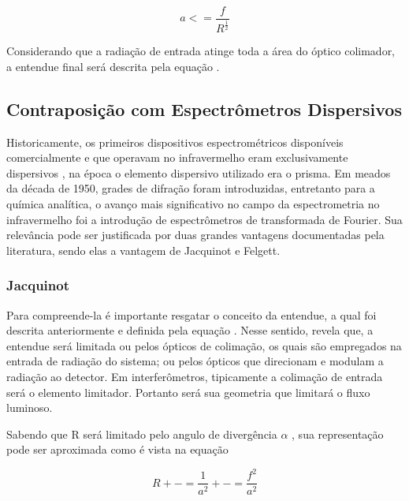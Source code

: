 \documentclass[oneside,openright,12pt]{ufsm_2021} %
\begin{document}
    \begin{equation}
        a <= \frac{f}{R^{\frac{1}{2}}}
    \end{equation}
    
    \par Considerando que a radiação de entrada atinge toda a área do óptico colimador, a entendue final será descrita pela equação \cite{Eq8}.

    \subsection{Contraposição com Espectrômetros Dispersivos}

    \par Historicamente, os primeiros dispositivos espectrométricos disponíveis comercialmente e que operavam no infravermelho eram exclusivamente dispersivos \cite{LivroFundamentos}, na época o elemento dispersivo utilizado era o prisma. Em meados da década de 1950, grades de difração foram introduzidas, entretanto para a química analítica, o avanço mais significativo no campo da espectrometria no infravermelho foi a introdução de espectrômetros de transformada de Fourier. Sua relevância pode ser justificada por duas grandes vantagens documentadas pela literatura, sendo elas a vantagem de Jacquinot e Felgett.

    \subsubsection{Jacquinot}
    \par Para compreende-la é importante resgatar o conceito da entendue, a qual foi descrita anteriormente e definida pela equação \cite{Eq1}. Nesse sentido, \cite{LivroFT} revela que, a entendue será limitada ou pelos ópticos de colimação, os quais são empregados na entrada de radiação do sistema; ou pelos ópticos que direcionam e modulam a radiação ao detector. Em interferômetros, tipicamente a colimação de entrada será o elemento limitador. Portanto será sua geometria que limitará o fluxo luminoso. 
    
    \par Sabendo que R será limitado pelo angulo de divergência $\alpha$ \cite{LivroFT}, sua representação pode ser aproximada como é vista na equação \cite{Eq6}

    \begin{equation}
        R +-=\frac{1}{a^2} +-= \frac{f^2}{a^2}  
    \end{equation}
\end{document}
